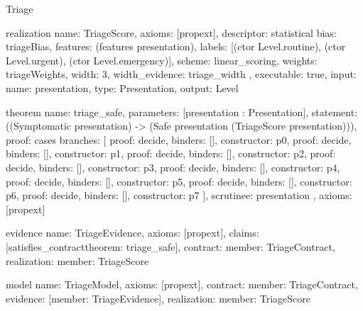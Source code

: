\begin{lexlean}{Triage}
\begin{semanticmodule}
realization{
  name: TriageScore,
  axioms: [propext],
  descriptor: statistical{
    bias: triageBias,
    features: (features presentation),
    labels: [(ctor Level.routine), (ctor Level.urgent), (ctor Level.emergency)],
    scheme: linear_scoring,
    weights: triageWeights,
    width: 3,
    width_evidence: triage_width
  },
  executable: true,
  input: {name: presentation, type: Presentation},
  output: Level
}

theorem{
  name: triage_safe,
  parameters: [presentation : Presentation],
  statement: ((Symptomatic presentation) -> (Safe presentation (TriageScore presentation))),
  proof: cases{
    branches: [
      {proof: decide{}, binders: [], constructor: p0},
      {proof: decide{}, binders: [], constructor: p1},
      {proof: decide{}, binders: [], constructor: p2},
      {proof: decide{}, binders: [], constructor: p3},
      {proof: decide{}, binders: [], constructor: p4},
      {proof: decide{}, binders: [], constructor: p5},
      {proof: decide{}, binders: [], constructor: p6},
      {proof: decide{}, binders: [], constructor: p7}
    ],
    scrutinee: presentation
  },
  axioms: [propext]
}

evidence{
  name: TriageEvidence,
  axioms: [propext],
  claims: [satisfies_contract{theorem: triage_safe}],
  contract: {member: TriageContract},
  realization: {member: TriageScore}
}

model{
  name: TriageModel,
  axioms: [propext],
  contract: {member: TriageContract},
  evidence: [{member: TriageEvidence}],
  realization: {member: TriageScore}
}
\end{semanticmodule}
\end{lexlean}
